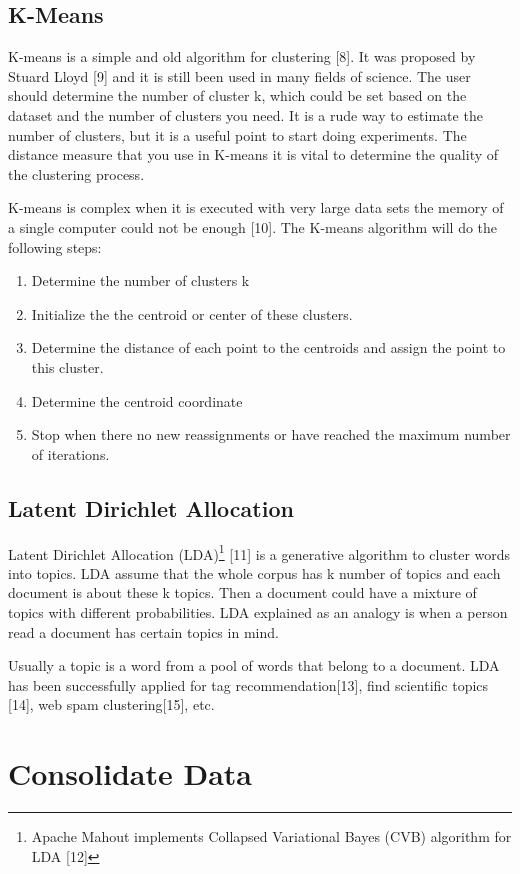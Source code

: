 \documentclass[11pt]{article}
\begin{document}
\subsection{K-Means}

K-means is a simple and old algorithm for clustering [8]. It was proposed by Stuard Lloyd [9] and it is still been used in many fields of science. The user should determine the number of cluster k, which could be set based on the dataset and the number of clusters you need. It is a rude way to estimate the number of clusters, but it is a useful point to start doing experiments. The distance measure that you use in K-means it is vital to determine the quality of the clustering process. 

K-means is complex when it is executed with very large data sets the memory of a single computer could not be enough [10]. The K-means algorithm will do the following steps:
\begin{enumerate}
	\item Determine the number of clusters k
	\item Initialize the the centroid or center of these clusters.
	\item Determine the distance of each point to the centroids and assign the point to this cluster.
	\item Determine the centroid coordinate
	\item Stop when there no new reassignments or have reached the maximum number of iterations. 
\end{enumerate} 

\subsection{Latent Dirichlet Allocation}

Latent Dirichlet Allocation (LDA)\footnote{Apache Mahout implements Collapsed Variational Bayes (CVB) algorithm for LDA [12]} [11] is a generative algorithm to cluster words into topics. LDA assume that the whole corpus has k number of topics and each document is about these k topics. Then a document could have a mixture of topics with different probabilities. LDA explained as an analogy is when a person read a document has certain topics in mind. 

Usually a topic is a word from a pool of words that belong to a document. LDA has been successfully applied for tag recommendation[13], find scientific topics [14], web spam clustering[15], etc.

\section{Consolidate Data}
\end{document}
